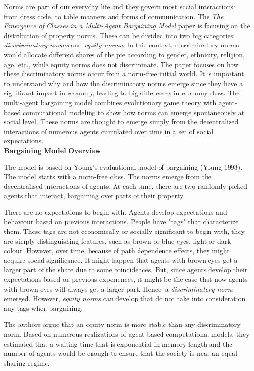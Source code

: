 \documentclass[../main.tex]{subfiles}
\begin{document}
Norms are part of our everyday life and they govern most social interactions: from dress code, to table manners and forms of communication. The \textit{The Emergence of Classes in a Multi-Agent Bargaining Model} paper is focusing on the distribution of property norms. These can be divided into two big categories: \textit{discriminatory norms} and \textit{equity norms}. In this context, discriminatory norms would allocate different shares of the pie according to gender, ethnicity, religion, age, etc., while equity norms does not discriminate. The paper focuses on how these discriminatory norms occur from a norm-free initial world. It is important to understand why and how the discriminatory norms emerge since they have a significant impact in economy, leading to big differences in economy class. The multi-agent bargaining model combines evolutionary game theory with agent-based computational modeling to show how norms can emerge spontaneously at social level. These norms are thought to emerge simply from the decentralized interactions of numerous agents cumulated over time in a set of social expectations.\\

\textbf{Bargaining Model Overview}

The model is based on Young's evaluational model of bargaining (Young 1993). The model starts with a norm-free class. The norms emerge from the decentralised interactions of agents. At each time, there are two randomly picked agents that interact, bargaining over parts of their property. 

There are no expectations to begin with. Agents develop expectations and behaviour based on previous interactions. People have "tags" that characterize them. These tags are not economically or socially significant to begin with, they are simply distinguishing features, such as brown or blue eyes, light or dark colour. However, over time, because of path dependence effects, they might acquire social significance. It might happen that agents with brown eyes get a larger part of the share due to some coincidences. But, since agents develop their expectations based on previous experiences, it might be the case that now agents with brown eyes will always get a larger part. Hence, a \textit{discriminatory norm} emerged. However, \textit{equity norms} can develop that do not take into consideration any tags when bargaining.

The authors argue that an equity norm is more stable than any discriminatory norm. Based on numerous realizations of agent-based computational models, they estimated that a waiting time that is exponential in memory length and the number of agents would be enough to ensure that the society is near an equal sharing regime. \\
\end{document}
